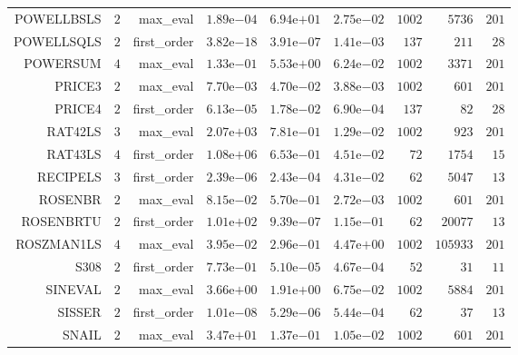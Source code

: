 \begin{longtable}{rrrrrrrrr}
POWELLBSLS & \(     2\) & max\_eval & \( 1.89\)e\(-04\) & \( 6.94\)e\(+01\) & \( 2.75\)e\(-02\) & \(  1002\) & \(  5736\) & \(   201\) \\
POWELLSQLS & \(     2\) & first\_order & \( 3.82\)e\(-18\) & \( 3.91\)e\(-07\) & \( 1.41\)e\(-03\) & \(   137\) & \(   211\) & \(    28\) \\
POWERSUM & \(     4\) & max\_eval & \( 1.33\)e\(-01\) & \( 5.53\)e\(+00\) & \( 6.24\)e\(-02\) & \(  1002\) & \(  3371\) & \(   201\) \\
PRICE3 & \(     2\) & max\_eval & \( 7.70\)e\(-03\) & \( 4.70\)e\(-02\) & \( 3.88\)e\(-03\) & \(  1002\) & \(   601\) & \(   201\) \\
PRICE4 & \(     2\) & first\_order & \( 6.13\)e\(-05\) & \( 1.78\)e\(-02\) & \( 6.90\)e\(-04\) & \(   137\) & \(    82\) & \(    28\) \\
RAT42LS & \(     3\) & max\_eval & \( 2.07\)e\(+03\) & \( 7.81\)e\(-01\) & \( 1.29\)e\(-02\) & \(  1002\) & \(   923\) & \(   201\) \\
RAT43LS & \(     4\) & first\_order & \( 1.08\)e\(+06\) & \( 6.53\)e\(-01\) & \( 4.51\)e\(-02\) & \(    72\) & \(  1754\) & \(    15\) \\
RECIPELS & \(     3\) & first\_order & \( 2.39\)e\(-06\) & \( 2.43\)e\(-04\) & \( 4.31\)e\(-02\) & \(    62\) & \(  5047\) & \(    13\) \\
ROSENBR & \(     2\) & max\_eval & \( 8.15\)e\(-02\) & \( 5.70\)e\(-01\) & \( 2.72\)e\(-03\) & \(  1002\) & \(   601\) & \(   201\) \\
ROSENBRTU & \(     2\) & first\_order & \( 1.01\)e\(+02\) & \( 9.39\)e\(-07\) & \( 1.15\)e\(-01\) & \(    62\) & \( 20077\) & \(    13\) \\
ROSZMAN1LS & \(     4\) & max\_eval & \( 3.95\)e\(-02\) & \( 2.96\)e\(-01\) & \( 4.47\)e\(+00\) & \(  1002\) & \(105933\) & \(   201\) \\
S308 & \(     2\) & first\_order & \( 7.73\)e\(-01\) & \( 5.10\)e\(-05\) & \( 4.67\)e\(-04\) & \(    52\) & \(    31\) & \(    11\) \\
SINEVAL & \(     2\) & max\_eval & \( 3.66\)e\(+00\) & \( 1.91\)e\(+00\) & \( 6.75\)e\(-02\) & \(  1002\) & \(  5884\) & \(   201\) \\
SISSER & \(     2\) & first\_order & \( 1.01\)e\(-08\) & \( 5.29\)e\(-06\) & \( 5.44\)e\(-04\) & \(    62\) & \(    37\) & \(    13\) \\
SNAIL & \(     2\) & max\_eval & \( 3.47\)e\(+01\) & \( 1.37\)e\(-01\) & \( 1.05\)e\(-02\) & \(  1002\) & \(   601\) & \(   201\) \\

\end{longtable}
